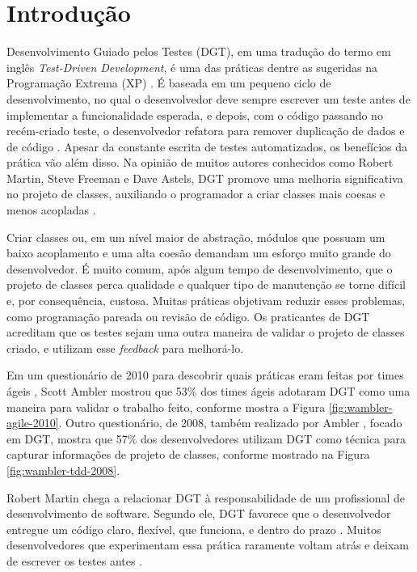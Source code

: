 \chapter{Introdução}
\label{cap:introducao}

Desenvolvimento Guiado pelos Testes (DGT), em uma tradução do termo
em inglês \textit{Test-Driven Development},
é uma das práticas dentre as sugeridas na Programação
Extrema (XP) \cite{XPExplained}. É baseada em um pequeno ciclo de
desenvolvimento, no qual o desenvolvedor deve sempre escrever um teste antes
de implementar a funcionalidade esperada, e depois, com o código
passando no recém-criado teste, o desenvolvedor refatora para 
remover duplicação de dados e de código \cite{TDDByExample}.
Apesar da constante escrita de testes automatizados, os benefícios da
prática vão além disso. Na opinião de muitos autores conhecidos como Robert Martin,
Steve Freeman e Dave Astels, DGT promove
uma melhoria significativa no projeto de classes, auxiliando o programador a
criar classes mais coesas e menos acopladas \cite{TDDByExample} \cite{GOOS} 
\cite{astels-tdd}.

Criar classes ou, em um nível maior de abstração, módulos que possuam um baixo
acoplamento e uma alta coesão demandam um esforço muito grande do desenvolvedor. 
É muito comum, após algum tempo de desenvolvimento, que o projeto de classes perca qualidade
e qualquer tipo de manutenção se torne difícil e, por consequência, custosa.
Muitas práticas objetivam reduzir esses problemas, como programação pareada ou
revisão de código. Os praticantes de DGT acreditam que os testes sejam uma outra
maneira de validar o projeto de classes criado, e utilizam esse \textit{feedback} para melhorá-lo.

Em um questionário de 2010 para descobrir quais práticas eram feitas por times
ágeis \cite{wambler-survey-agile}, Scott Ambler mostrou que 53\% dos times ágeis
adotaram DGT como uma maneira para validar o trabalho feito, conforme mostra a 
Figura \ref{fig:wambler-agile-2010}. Outro questionário, de 2008, também realizado por Ambler
\cite{wambler-survey-tdd}, focado em DGT, mostra que 57\% dos desenvolvedores 
utilizam DGT como técnica para capturar informações de projeto de classes, conforme mostrado
na Figura \ref{fig:wambler-tdd-2008}.

Robert Martin chega a relacionar DGT à responsabilidade de um 
profissional de desenvolvimento de software. 
Segundo ele, DGT favorece que o desenvolvedor entregue um 
código claro, flexível, que funciona, e dentro do prazo \cite{martin-profissionalismo}.
Muitos desenvolvedores que experimentam essa prática raramente voltam atrás e deixam
de escrever os testes antes \cite{tdd-fearless}. 

